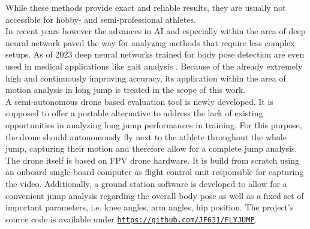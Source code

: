 \noindent While these methods provide exact and reliable results, they are 
usually not accessible for hobby- and semi-professional athletes.\\
In recent years however the advances in \ac{AI} and especially within the area 
of deep neural network paved the way for analyzing methods that require less 
complex setups.
As of 2023 deep neural networks trained for body pose detection are even used 
in medical applications like gait analysis \cite{mp_gait_analysis}.
Because of the already extremely high and continuously improving accuracy, 
its application within the area of motion analysis in long jump is treated in 
the scope of this work.\\
A semi-autonomous drone based evaluation tool is newly developed.
It is supposed to offer a portable alternative to address the lack of existing
opportunities in analyzing long jump performances in training.
For this purpose, the drone should autonomously fly next to the athlete 
throughout the whole jump, capturing their motion and therefore allow for a 
complete jump analysis.
The drone itself is based on \ac{FPV} drone hardware.
It is build from scratch using an onboard single-board computer as flight 
control unit responsible for capturing the video.
Additionally, a ground station software is developed to allow for a convenient
jump analysis regarding the overall body pose as well as a fixed set of 
important parameters, i.e. knee angles, arm angles, hip position. 
The project's source code is available under \texttt{\url{https://github.com/JF631/FLYJUMP}}.
